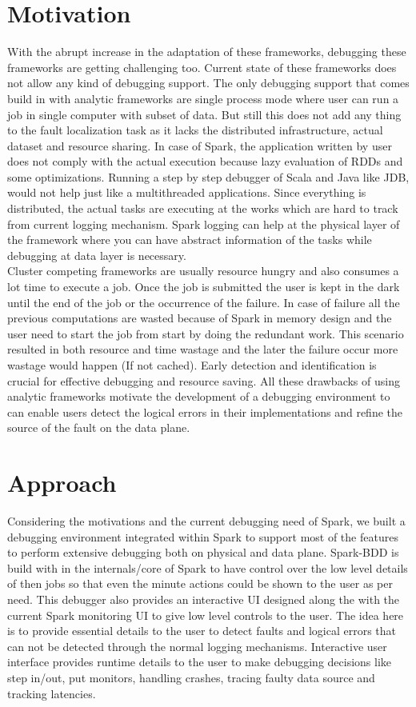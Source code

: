 \documentclass{acm_proc_article-sp}
\begin{document}
\section{Motivation}
With the abrupt increase in the adaptation of these frameworks, debugging these frameworks are getting challenging too. Current state of these frameworks does not allow any kind of debugging support. The only debugging support that comes build in with analytic frameworks are single process mode where user can run a job in single computer with subset of data. But still this does not add any thing to the fault localization task as it lacks the distributed infrastructure, actual dataset and resource sharing. In case of Spark, the application written by user does not comply with the actual execution because lazy evaluation of RDDs and some optimizations. Running a step by step debugger of Scala and Java like JDB, would not help just like a multithreaded applications. Since everything is distributed, the actual tasks are executing at the works which are hard to track from current logging mechanism. Spark logging can help at the physical layer of the framework where you can have abstract information of the tasks while debugging at data layer is necessary.\\
Cluster competing frameworks are usually resource hungry and also consumes a lot time to execute a job. Once the job is submitted the user  is kept in the dark until the end of the job or the occurrence of the failure. In case of failure all the previous computations are wasted because of Spark in memory design and the user need to start the job from start by doing the redundant work. This scenario resulted in both resource and time wastage and the later the failure occur more wastage would happen (If not cached).  Early detection and identification is crucial for effective debugging and resource saving. All these drawbacks of using analytic frameworks motivate the development of a debugging environment to can enable users detect the logical errors in their implementations and refine the source of the fault on the data plane.


\section{Approach}
Considering the motivations and the current debugging need of Spark, we built a debugging environment integrated within Spark to support most of the features to perform extensive debugging both on physical and data plane. Spark-BDD is build with in the internals/core of Spark to have control over the low level details of then jobs so that even the minute actions could be shown to the user as per need. This debugger also provides an interactive UI designed along the with the current Spark monitoring UI to give low level controls to the user.  The idea here is to provide essential details to the user to detect faults and logical errors that can not be detected through the normal logging mechanisms. Interactive user interface provides runtime details to the user to make debugging decisions like step in/out, put monitors, handling crashes, tracing faulty data source and tracking latencies.
\end{document}
